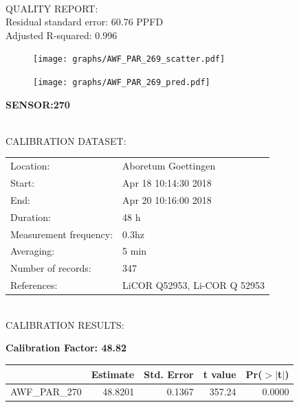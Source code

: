\documentclass[oneside]{report}
\begin{document}
\hrulefill\\
QUALITY REPORT:\\
Residual standard error: 60.76 PPFD\\
Adjusted R-squared: 0.996



\begin{figure}[H]
  \centering
  \texttt{[image: graphs/AWF\_PAR\_269\_scatter.pdf]}
\end{figure}




\begin{figure}[H]
  \centering
  \texttt{[image: graphs/AWF\_PAR\_269\_pred.pdf]}
\end{figure}

\pagebreak


\begin{center}
\large{\textbf{SENSOR:270}}\\
\end{center}

\hrulefill\\
CALIBRATION DATASET:\\
\begin{table}[h!]
  \centering
  \label{tab:table1}
  \begin{tabular}{ll}
    Location: & Aboretum Goettingen\\ 
    
    
    Start:  & Apr 18 10:14:30 2018 \\
    End:   & Apr 20 10:16:00 2018\\ 
    Duration: & 48 h\\
    Measurement frequency: & 0.3hz\\
    Averaging:  &5 min\\
    Number of records: & 347 \\
    References: & LiCOR Q52953, Li-COR Q 52953 \\
  \end{tabular}
\end{table}

\hrulefill\\
CALIBRATION RESULTS:\\


\begin{center}
\textbf{\large{Calibration Factor: 48.82}}\\
\end{center}
\begin{table}[ht]
\centering
\begin{tabular}{rrrrr}
  \hline
 & Estimate & Std. Error & t value & Pr($>$$|$t$|$) \\ 
  \hline
AWF\_PAR\_270 & 48.8201 & 0.1367 & 357.24 & 0.0000 \\ 
   \hline
\end{tabular}
\end{table}
\end{document}
